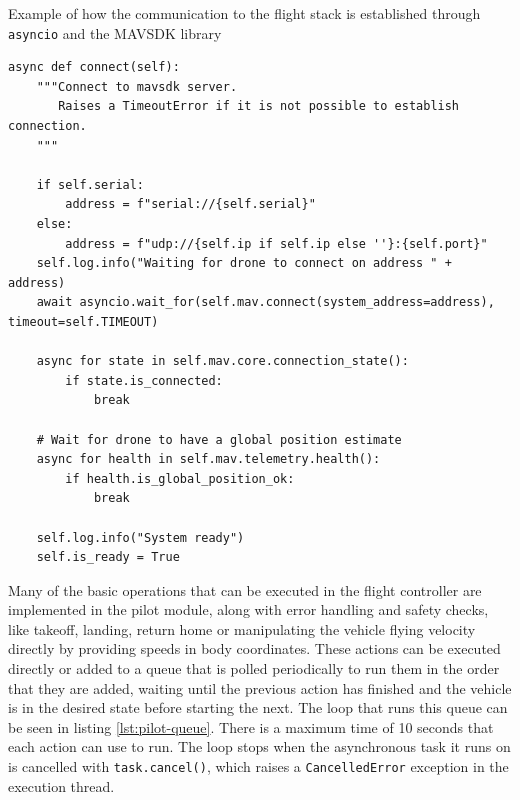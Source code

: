 \begin{listing}[h]
    \caption{Example of how the communication to the flight stack is established through \texttt{asyncio} and the MAVSDK library}{}
    \label{lst:pilot-connect}
    \begin{verbatim}
async def connect(self):
    """Connect to mavsdk server.
       Raises a TimeoutError if it is not possible to establish connection.
    """
    
    if self.serial:
        address = f"serial://{self.serial}"
    else:
        address = f"udp://{self.ip if self.ip else ''}:{self.port}"
    self.log.info("Waiting for drone to connect on address " + address)
    await asyncio.wait_for(self.mav.connect(system_address=address), timeout=self.TIMEOUT)

    async for state in self.mav.core.connection_state():
        if state.is_connected:
            break

    # Wait for drone to have a global position estimate
    async for health in self.mav.telemetry.health():
        if health.is_global_position_ok:
            break
        
    self.log.info("System ready")
    self.is_ready = True
    \end{verbatim}
\end{listing}

Many of the basic operations that can be executed in the flight controller are implemented in the pilot module, along with error handling and safety checks, like takeoff, landing, return home or manipulating the vehicle flying velocity directly by providing speeds in body coordinates.
These actions can be executed directly or added to a queue that is polled periodically to run them in the order that they are added, waiting until the previous action has finished and the vehicle is in the desired state before starting the next.
The loop that runs this queue can be seen in listing \ref{lst:pilot-queue}.
There is a maximum time of 10 seconds that each action can use to run.
The loop stops when the asynchronous task it runs on is cancelled with \texttt{task.cancel()}, which raises a \texttt{CancelledError} exception in the execution thread.

